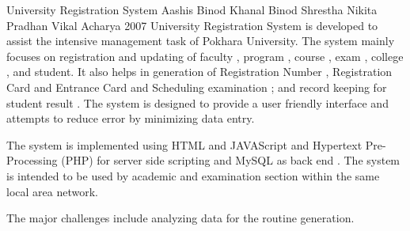  \begin{conf-abstract}[]
{University Registration System }
{
Aashis Binod Khanal
Binod Shrestha
Nikita Pradhan
Vikal Acharya
}
{2007}
University Registration System is developed  to assist the intensive  management task of Pokhara University. The system mainly focuses on registration and updating of faculty , program , course , exam , college , and student. It also helps in generation of Registration Number , Registration Card and Entrance Card and Scheduling examination ; and record keeping for student result . The system is designed to provide a user friendly interface and attempts to reduce error by minimizing data entry.

The system is implemented using HTML and JAVAScript and Hypertext Pre-Processing (PHP) for server side scripting and MySQL as back end . The system is intended to be used by academic and examination section within the same local area network.

The major challenges include analyzing data for the routine generation.
  \end{conf-abstract}